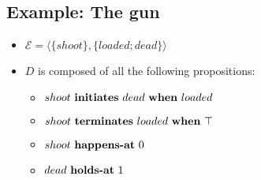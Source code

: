 \subsection{Example: The gun}

\begin{itemize}
  \item $\mathcal{E}=\langle \{shoot\},\{loaded;dead\}\rangle$
  \item $D$ is composed of all the following propositions:
  \begin{itemize}
    \item $shoot \text{ \textbf{initiates} } dead \text{ \textbf{when} } loaded$
    \item $shoot \text{ \textbf{terminates} } loaded \text{ \textbf{when} } \top$
    \item $shoot \text{ \textbf{happens-at} } 0$
    \item $dead \text{ \textbf{holds-at} } 1$
  \end{itemize}
\end{itemize}
